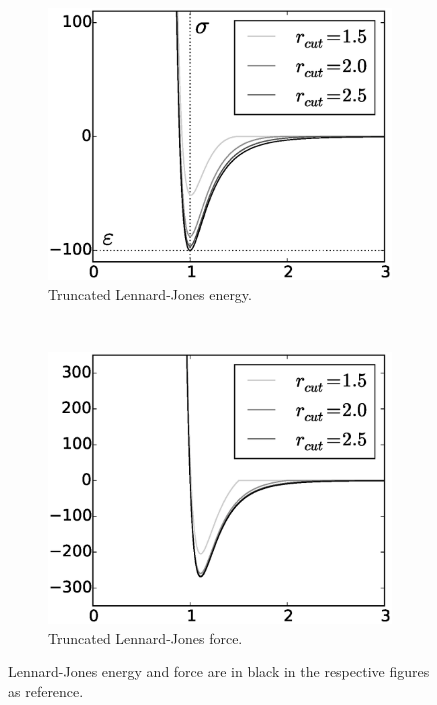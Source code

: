 	\begin{figure}[t]
		\centering
		\begin{subfigure}[t]{.5\textwidth}
			\centering
			\includegraphics[scale=.5]{./fig/ch2/ljc_e.eps}
			\caption{Truncated Lennard-Jones energy. \label{subfig:LJTEnergy}}
		\end{subfigure}%
		~
		\begin{subfigure}[t]{.5\textwidth}
			\centering
			\includegraphics[scale=.5]{./fig/ch2/ljc_f.eps}
			\caption{Truncated Lennard-Jones force. \label{subfig:LJTForce}}
		\end{subfigure}		
		\caption{Lennard-Jones energy and force are in black in the respective figures as reference.\label{fig:LJT}}	
	\end{figure}	

